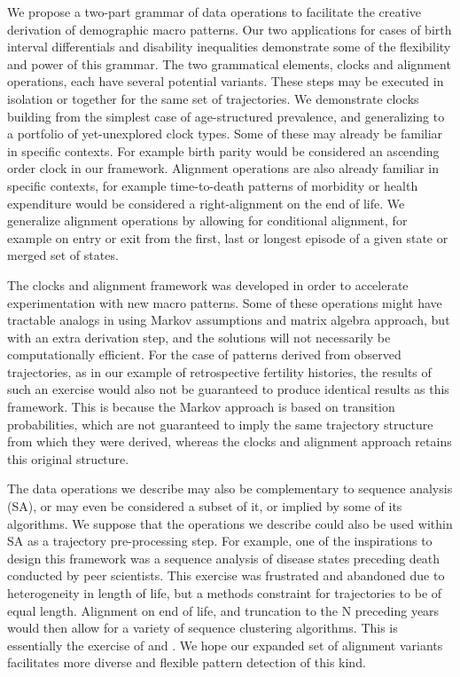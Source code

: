 \documentclass{article}
\begin{document}
We propose a two-part grammar of data operations to facilitate the creative derivation of demographic macro patterns. Our two applications for cases of birth interval differentials and disability inequalities demonstrate some of the flexibility and power of this grammar. The two grammatical elements, clocks and alignment operations, each have several potential variants. These steps may be executed in isolation or together for the same set of trajectories. We demonstrate clocks building from the simplest case of age-structured prevalence, and generalizing to a portfolio of yet-unexplored clock types. Some of these may already be familiar in specific contexts. For example birth parity would be considered an ascending order clock in our framework. Alignment operations are also already familiar in specific contexts, for example time-to-death patterns of morbidity or health expenditure would be considered a right-alignment on the end of life. We generalize alignment operations by allowing for conditional alignment, for example on entry or exit from the first, last or longest episode of a given state or merged set of states.

The clocks and alignment framework was developed in order to accelerate experimentation with new macro patterns. Some of these operations might have tractable analogs in using Markov assumptions and matrix algebra approach, but with an extra derivation step, and the solutions will not necessarily be computationally efficient. For the case of patterns derived from observed trajectories, as in our example of retrospective fertility histories, the results of such an exercise would also not be guaranteed to produce identical results as this framework. This is because the Markov approach is based on transition probabilities, which are not guaranteed to imply the same trajectory structure from which they were derived, whereas the clocks and alignment approach retains this original structure. 

The data operations we describe may also be complementary to sequence analysis (SA), or may even be considered a subset of it, or implied by some of its algorithms. We suppose that the operations we describe could also be used within SA as a trajectory pre-processing step. For example, one of the inspirations to design this framework was a sequence analysis of disease states preceding death conducted by peer scientists. This exercise was frustrated and abandoned due to heterogeneity in length of life, but a methods constraint for trajectories to be of equal length. Alignment on end of life, and truncation to the N preceding years would then allow for a variety of sequence clustering algorithms. This is essentially the exercise of \citet{potente2018disability} and \citet{raab2018pathways}. We hope our expanded set of alignment variants facilitates more diverse and flexible pattern detection of this kind.
\end{document}
